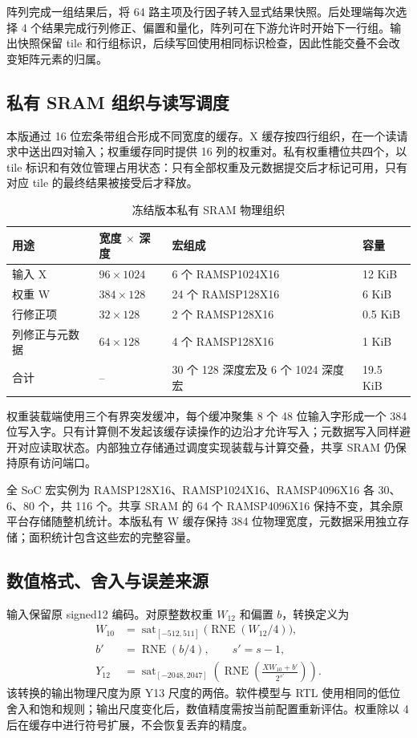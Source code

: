 \documentclass[UTF8,punct,fontset=none,zihao=-4]{ctexart}
\newcommand{\RNE}{\operatorname{RNE}}
\newcommand{\sat}{\operatorname{sat}}
\begin{document}
阵列完成一组结果后，将 64 路主项及行因子转入显式结果快照。后处理端每次选择 4 个结果完成行列修正、偏置和量化，阵列可在下游允许时开始下一行组。输出快照保留 tile 和行组标识，后续写回使用相同标识检查，因此性能交叠不会改变矩阵元素的归属。

\subsection{私有 SRAM 组织与读写调度}
本版通过 16 位宏条带组合形成不同宽度的缓存。X 缓存按四行组织，在一个读请求中送出四对输入；权重缓存同时提供 16 列的权重对。私有权重槽位共四个，以 tile 标识和有效位管理占用状态：只有全部权重及元数据提交后才标记可用，只有对应 tile 的最终结果被接受后才释放。

\begin{table}[H]\centering\small
\caption{冻结版本私有 SRAM 物理组织}
\begin{tabularx}{\linewidth}{p{25mm}p{28mm}p{41mm}Y}\toprule
用途 & 宽度 $\times$ 深度 & 宏组成 & 容量\\\midrule
输入 X & $96\times1024$ & 6 个 RAMSP1024X16 & 12 KiB\\
权重 W & $384\times128$ & 24 个 RAMSP128X16 & 6 KiB\\
行修正项 & $32\times128$ & 2 个 RAMSP128X16 & 0.5 KiB\\
列修正与元数据 & $64\times128$ & 4 个 RAMSP128X16 & 1 KiB\\\midrule
合计 & -- & 30 个 128 深度宏及 6 个 1024 深度宏 & 19.5 KiB\\
\bottomrule\end{tabularx}
\end{table}

权重装载端使用三个有界突发缓冲，每个缓冲聚集 8 个 48 位输入字形成一个 384 位写入字。只有计算侧不发起该缓存读操作的边沿才允许写入；元数据写入同样避开对应读取状态。内部独立存储通过调度实现装载与计算交叠，共享 SRAM 仍保持原有访问端口。

全 SoC 宏实例为 RAMSP128X16、RAMSP1024X16、RAMSP4096X16 各 30、6、80 个，共 116 个。共享 SRAM 的 64 个 RAMSP4096X16 保持不变，其余原平台存储随整机统计。本版私有 W 缓存保持 384 位物理宽度，元数据采用独立存储；面积统计包含这些宏的完整容量。



\subsection{数值格式、舍入与误差来源}
输入保留原 signed12 编码。对原整数权重 $W_{12}$ 和偏置 $b$，转换定义为
\begin{align}
W_{10}&=\sat_{[-512,511]}\bigl(\RNE(W_{12}/4)\bigr),\\
b'&=\RNE(b/4),\qquad s'=s-1,\\
Y_{12}&=\sat_{[-2048,2047]}\left(\RNE\left(\frac{XW_{10}+b'}{2^{s'}}\right)\right).
\end{align}
该转换的输出物理尺度为原 Y13 尺度的两倍。软件模型与 RTL 使用相同的低位舍入和饱和规则；输出尺度变化后，数值精度需按当前配置重新评估。权重除以 4 后在缓存中进行符号扩展，不会恢复丢弃的精度。
\end{document}
